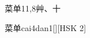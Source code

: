 \begin{entry}{菜单}{11,8}{⾋、⼗}
  \begin{phonetics}{菜单}{cai4dan1}[][HSK 2]
  \end{phonetics}
\end{entry}
